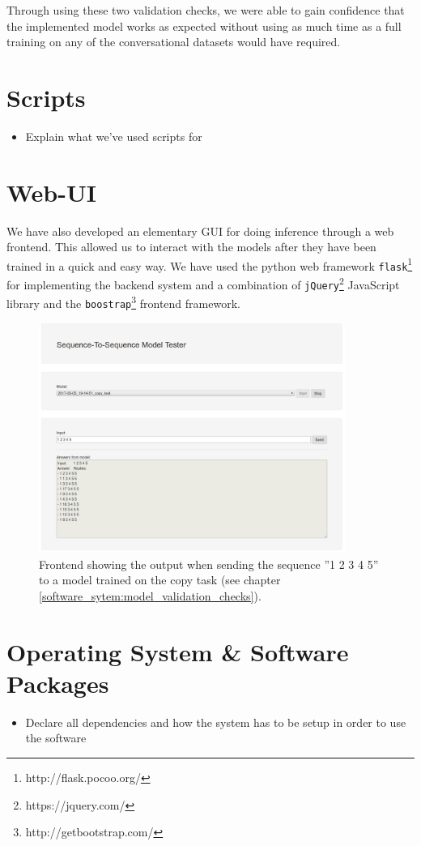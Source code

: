 Through using these two validation checks, we were able to gain confidence that the implemented model works as expected without using as much time as a full training on any of the conversational datasets would have required.

\section{Scripts}
\begin{itemize}
	\item Explain what we've used scripts for
\end{itemize}
\section{Web-UI}
We have also developed an elementary GUI for doing inference through a web frontend. This allowed us to interact with the models after they have been trained in a quick and easy way. We have used the python web framework \texttt{flask}\footnote{http://flask.pocoo.org/} for implementing the backend system and a combination of \texttt{jQuery}\footnote{https://jquery.com/} JavaScript library and the \texttt{boostrap}\footnote{http://getbootstrap.com/} frontend framework.

\begin{figure}[h]
	\label{fundamentals:lstm:internal_structure}
	\centering
	\includegraphics[width=10cm]{img/web_frontend_inference}
	\caption{Frontend showing the output when sending the sequence ''1 2 3 4 5'' to a model trained on the copy task (see chapter \ref{software_sytem:model_validation_checks}).}
\end{figure}

\section{Operating System \& Software Packages}
\begin{itemize}
	\item Declare all dependencies and how the system has to be setup in order to use the software
\end{itemize}
